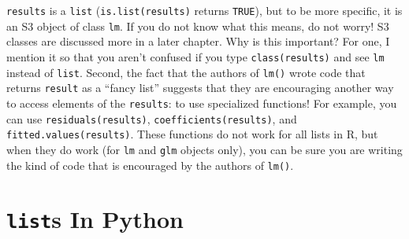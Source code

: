 \documentclass[
  12pt,
]{krantz}
\makeatletter
\newenvironment{Shaded}{\begin{snugshade}}{\end{snugshade}}
\newcommand{\AttributeTok}[1]{\textcolor[rgb]{0.61,0.61,0.61}{#1}}
\newcommand{\DocumentationTok}[1]{\textcolor[rgb]{0.37,0.37,0.37}{\textbf{\textit{#1}}}}
\newcommand{\FunctionTok}[1]{\textcolor[rgb]{0,0,0}{#1}}
\newcommand{\NormalTok}[1]{#1}
\newcommand{\OtherTok}[1]{\textcolor[rgb]{0.37,0.37,0.37}{#1}}
\newcommand{\SpecialCharTok}[1]{\textcolor[rgb]{0,0,0}{#1}}
\newcommand{\StringTok}[1]{\textcolor[rgb]{0.5,0.5,0.5}{#1}}
\newenvironment{kframe}{%
\medskip{}
\setlength{\fboxsep}{.8em}
 \def\at@end@of@kframe{}%
 \ifinner\ifhmode%
  \def\at@end@of@kframe{\end{minipage}}%
  \begin{minipage}{\columnwidth}%
 \fi\fi%
 \def\FrameCommand##1{\hskip\@totalleftmargin \hskip-\fboxsep
 \colorbox{shadecolor}{##1}\hskip-\fboxsep
     \hskip-\linewidth \hskip-\@totalleftmargin \hskip\columnwidth}%
 \MakeFramed {\advance\hsize-\width
   \@totalleftmargin\z@ \linewidth\hsize
   \@setminipage}}%
 {\par\unskip\endMakeFramed%
 \at@end@of@kframe}
\renewenvironment{Shaded}{\begin{kframe}}{\end{kframe}}
\makeatother
\begin{document}
\begin{Shaded}
\end{Shaded}

\texttt{results} is a \texttt{list} (\texttt{is.list(results)} returns \texttt{TRUE}), but to be more specific, it is an S3 object of class \texttt{lm}. If you do not know what this means, do not worry! S3 classes are discussed more in a later chapter. Why is this important? For one, I mention it so that you aren't confused if you type \texttt{class(results)} and see \texttt{lm} instead of \texttt{list}. Second, the fact that the authors of \texttt{lm()} wrote code that returns \texttt{result} as a ``fancy list'' suggests that they are encouraging another way to access elements of the \texttt{results}: to use specialized functions! For example, you can use \texttt{residuals(results)}, \texttt{coefficients(results)}, and \texttt{fitted.values(results)}. These functions do not work for all lists in R, but when they do work (for \texttt{lm} and \texttt{glm} objects only), you can be sure you are writing the kind of code that is encouraged by the authors of \texttt{lm()}.

\hypertarget{lists-in-python}{%
\section{\texorpdfstring{\texttt{list}s In Python}{lists In Python}}\label{lists-in-python}}
\end{document}
